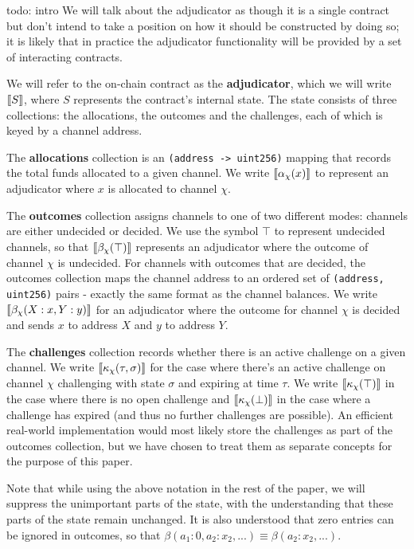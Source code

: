 todo: intro
We will talk about the adjudicator as though it is a single contract but don't intend to take a position on how it should be constructed by doing so; it is likely that in practice the adjudicator functionality will be provided by a set of interacting contracts.

We will refer to the on-chain contract as the \textbf{adjudicator}, which we will write $\llbracket S \rrbracket$, where $S$ represents the contract's internal state. The state consists of three collections: the allocations, the outcomes and the challenges, each of which is keyed by a channel address. 

The \textbf{allocations} collection is an \texttt{(address -> uint256)} mapping that records the total funds allocated to a given channel. We write $\llbracket \alpha_\chi(x) \rrbracket$ to represent an adjudicator where $x$ is allocated to channel $\chi$.

The \textbf{outcomes} collection assigns channels to one of two different modes: channels are either undecided or decided. We use the symbol $\top$ to represent undecided channels, so that $\llbracket \beta_\chi(\top) \rrbracket$ represents an adjudicator where the outcome of channel $\chi$ is undecided. For channels with outcomes that are decided, the outcomes collection maps the channel address to an ordered set of \texttt{(address, uint256)} pairs - exactly the same format as the channel balances. We write $\llbracket \beta_\chi(X: x, Y: y) \rrbracket$ for an adjudicator where the outcome for channel $\chi$ is decided and sends $x$ to address $X$ and $y$ to address $Y$.

The \textbf{challenges} collection records whether there is an active challenge on a given channel. We write $\llbracket \kappa_\chi(\tau, \sigma) \rrbracket$ for the case where there's an active challenge on channel $\chi$ challenging with state $\sigma$ and expiring at time $\tau$. We write $\llbracket \kappa_\chi(\top) \rrbracket$ in the case where there is no open challenge and $\llbracket \kappa_\chi(\bot) \rrbracket$ in the case where a challenge has expired (and thus no further challenges are possible). An efficient real-world implementation would most likely store the challenges as part of the outcomes collection, but we have chosen to treat them as separate concepts for the purpose of this paper.

Note that while using the above notation in the rest of the paper, we will suppress the unimportant parts of the state, with the understanding that these parts of the state remain unchanged. It is also understood that zero entries can be ignored in outcomes, so that $\beta(a_1: 0, a_2:x_2,...) \equiv \beta(a_2:x_2, ...)$.

